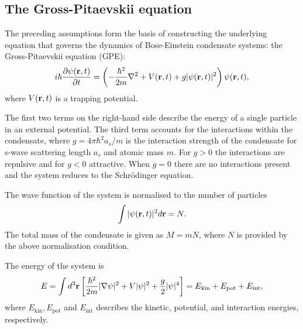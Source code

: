 \subsection{The Gross-Pitaevskii equation}
The preceding assumptions form the basis of constructing the underlying equation
that governs the dynamics of Bose-Einstein condensate systems: the
Gross-Pitaevskii equation (GPE):
\begin{equation}\label{eq: scalar-GPE}
    i\hbar \pdv{\psi(\vb{r}, t)}{t} = \left(-\frac{\hbar^2}{2m}\nabla^2
    + V(\vb{r}, t) +g|\psi(\vb{r}, t)|^2\right)\psi(\vb{r}, t),
\end{equation}
where \(V(\vb{r}, t)\) is a trapping potential.

The first two terms on the right-hand side describe the energy of a single
particle in an external potential.
The third term accounts for the interactions within the condensate, where
\(g=4\pi \hbar^2a_s/m\) is the interaction strength of the condensate for
s-wave scattering length \(a_s\) and atomic mass \(m\).
For \(g>0\) the interactions are repulsive and for \(g < 0\) attractive.
When \(g=0\) there are no interactions present and the system reduces to the
Schr\"{o}dinger equation.

The wave function of the system is normalised to the number of particles
\begin{equation}
    \int |\psi(\vb{r}, t)|^2 d\vb{r} = N.
\end{equation}
The total mass of the condensate is given as \(M=mN\), where \(N\) is provided
by the above normalisation condition.

The energy of the system is
\begin{equation}
    E = \int d^3\vb{r} \left[\frac{\hbar^2}{2m}|\nabla\psi|^2
    + V|\psi|^2 + \frac{g}{2}|\psi|^4\right]
    = E_\mathrm{kin} + E_\mathrm{pot} + E_\mathrm{int},
\end{equation}
where \(E_\mathrm{kin}, E_\mathrm{pot}\) and \(E_\mathrm{int}\) describes the
kinetic, potential, and interaction energies, respectively.

